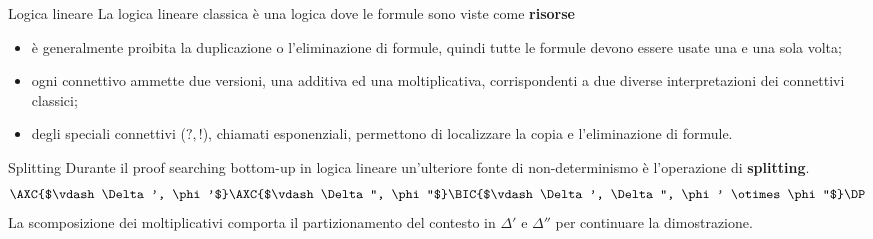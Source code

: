 \documentclass{beamer}
\newcommand{\llten}{\otimes}
\begin{document}
\begin{frame}{Logica lineare}
	La logica lineare classica è una logica dove le formule sono viste come \textbf{risorse}
	\begin{itemize}
		\item è generalmente proibita la duplicazione o l'eliminazione di formule, quindi tutte le formule devono essere usate una e una sola volta;
		\item ogni connettivo ammette due versioni, una additiva ed una moltiplicativa, corrispondenti a due diverse interpretazioni dei connettivi classici;
		\item degli speciali connettivi ($?, !$), chiamati esponenziali, permettono di localizzare la copia e l'eliminazione di formule.
	\end{itemize}
\end{frame}

\begin{frame}{Splitting}
	Durante il proof searching bottom-up in logica lineare un'ulteriore fonte di non-determinismo è l'operazione di \textbf{splitting}.
	$$
	\AXC{$\vdash \Delta', \phi'$}
	\AXC{$\vdash \Delta'', \phi''$}
	\LeftLabel{$\llten$}
	\BIC{$\vdash \Delta', \Delta'', \phi' \llten \phi''$}
	\DP
	$$
	La scomposizione dei moltiplicativi comporta il partizionamento del contesto in $\Delta'$ e $\Delta''$ per continuare la dimostrazione.
\end{frame}
\end{document}
